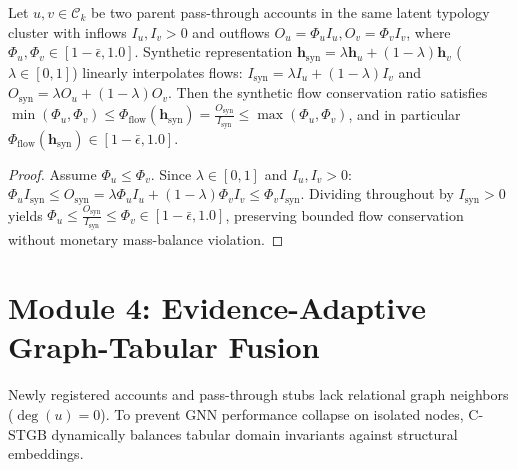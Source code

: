 \begin{proposition}
\label{prop:graphsmote_flow_preservation}
Let $u, v \in \mathcal{C}_k$ be two parent pass-through accounts in the same latent typology cluster with inflows $I_u, I_v > 0$ and outflows $O_u = \Phi_u I_u, O_v = \Phi_v I_v$, where $\Phi_u, \Phi_v \in [1 - \bar{\epsilon}, 1.0]$. Synthetic representation $\mathbf{h}_{\text{syn}} = \lambda \mathbf{h}_u + (1 - \lambda) \mathbf{h}_v$ ($\lambda \in [0, 1]$) linearly interpolates flows: $I_{\text{syn}} = \lambda I_u + (1 - \lambda) I_v$ and $O_{\text{syn}} = \lambda O_u + (1 - \lambda) O_v$. Then the synthetic flow conservation ratio satisfies $\min(\Phi_u, \Phi_v) \le \Phi_{\text{flow}}(\mathbf{h}_{\text{syn}}) = \frac{O_{\text{syn}}}{I_{\text{syn}}} \le \max(\Phi_u, \Phi_v)$, and in particular $\Phi_{\text{flow}}(\mathbf{h}_{\text{syn}}) \in [1 - \bar{\epsilon}, 1.0]$.
\end{proposition}
\begin{proof}
Assume $\Phi_u \le \Phi_v$. Since $\lambda \in [0, 1]$ and $I_u, I_v > 0$: $\Phi_u I_{\text{syn}} \le O_{\text{syn}} = \lambda \Phi_u I_u + (1 - \lambda) \Phi_v I_v \le \Phi_v I_{\text{syn}}$. Dividing throughout by $I_{\text{syn}} > 0$ yields $\Phi_u \le \frac{O_{\text{syn}}}{I_{\text{syn}}} \le \Phi_v \in [1 - \bar{\epsilon}, 1.0]$, preserving bounded flow conservation without monetary mass-balance violation.
\end{proof}

\section{Module 4: Evidence-Adaptive Graph-Tabular Fusion}\label{sec:ch3_mod4}
Newly registered accounts and pass-through stubs lack relational graph neighbors ($\deg(u) = 0$). To prevent GNN performance collapse on isolated nodes, C-STGB dynamically balances tabular domain invariants against structural embeddings.

